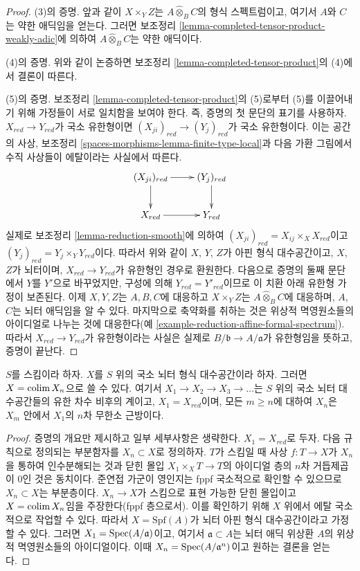 \begin{proof}
\medskip\noindent
(3)의 증명. 앞과 같이 $X \times_Y Z$는
$A \widehat{\otimes}_B C$의 형식 스펙트럼이고, 여기서 $A$와 $C$는
약한 애딕임을 얻는다. 그러면 보조정리
\ref{lemma-completed-tensor-product-weakly-adic}에 의하여
$A \widehat{\otimes}_B C$는 약한 애딕이다.

\medskip\noindent
(4)의 증명. 위와 같이 논증하면 보조정리
\ref{lemma-completed-tensor-product}의 (4)에서 결론이 따른다.

\medskip\noindent
(5)의 증명. 보조정리 \ref{lemma-completed-tensor-product}의 (5)로부터
(5)를 이끌어내기 위해 가정들이 서로 일치함을 보여야 한다.
즉, 증명의 첫 문단의 표기를 사용하자. %
$X_{red} \to Y_{red}$가 국소 유한형이면
$(X_{ji})_{red} \to (Y_j)_{red}$가 국소 유한형이다. 이는 공간의
사상, 보조정리 \ref{spaces-morphisms-lemma-finite-type-local}과 다음
가환 그림에서 수직 사상들이 에탈이라는 사실에서 따른다.
$$
\xymatrix{
(X_{ji})_{red} \ar[d] \ar[r] & (Y_j)_{red} \ar[d] \\
X_{red} \ar[r] & Y_{red}
}
$$
실제로 보조정리 \ref{lemma-reduction-smooth}에 의하여
$(X_{ji})_{red} = X_{ij} \times_X X_{red}$이고 %
$(Y_j)_{red} = Y_j \times_Y Y_{red}$이다. 따라서 위와 같이
$X$, $Y$, $Z$가 아핀 형식 대수공간이고, $X$, $Z$가 뇌터이며,
$X_{red} \to Y_{red}$가 유한형인 경우로 환원한다. 다음으로 증명의
둘째 문단에서 $Y$를 $Y'$으로 바꾸었지만, 구성에 의해
$Y_{red} = Y'_{red}$이므로 이 치환 아래 유한형 가정이 보존된다.
이제 $X, Y, Z$는 $A, B, C$에 대응하고 $X \times_Y Z$는
$A \widehat{\otimes}_B C$에 대응하며, $A$, $C$는 뇌터 애딕임을
알 수 있다. 마지막으로 축약화를 취하는 것은 위상적 멱영원소들의
아이디얼로 나누는 것에 대응한다(예
\ref{example-reduction-affine-formal-spectrum}). 따라서
$X_{red} \to Y_{red}$가 유한형이라는 사실은 실제로
$B/\mathfrak b \to A/\mathfrak a$가 유한형임을 뜻하고, 증명이
끝난다.
\end{proof}

\begin{lemma}
\label{lemma-structure-locally-noetherian}
$S$를 스킴이라 하자. $X$를 $S$ 위의 국소 뇌터 형식 대수공간이라
하자. 그러면 $X = \mathop{\mathrm{colim}}\nolimits X_n$으로 쓸 수 있다. 여기서
$X_1 \to X_2 \to X_3 \to \ldots$는 $S$ 위의 국소 뇌터
대수공간들의 유한 차수 비후의 계이고, $X_1 = X_{red}$이며, 모든
$m \geq n$에 대하여 $X_n$은 $X_m$ 안에서 $X_1$의 $n$차
무한소 근방이다.
\end{lemma}

\begin{proof}
증명의 개요만 제시하고 일부 세부사항은 생략한다.
$X_1 = X_{red}$로 두자. 다음 규칙으로 정의되는 부분함자를
$X_n \subset X$로 정의하자. $T$가 스킴일 때 사상
$f : T \to X$가 $X_n$을 통하여 인수분해되는 것과 닫힌 몰입
$X_1 \times_X T \to T$의 아이디얼 층의 $n$차 거듭제곱이 0인 것은
동치이다. 준연접 가군이 영인지는 fppf 국소적으로 확인할 수 있으므로
$X_n \subset X$는 부분층이다. $X_n \to X$가 스킴으로 표현 가능한
닫힌 몰입이고 $X = \mathop{\mathrm{colim}}\nolimits X_n$임을 주장한다(fppf 층으로서).
이를 확인하기 위해 $X$ 위에서 에탈 국소적으로 작업할 수 있다.
따라서 $X = \text{Spf}(A)$가 뇌터 아핀 형식 대수공간이라고 가정할
수 있다. 그러면 $X_1 = \mathop{\mathrm{Spec}}(A/\mathfrak a)$이고, 여기서
$\mathfrak a \subset A$는 뇌터 애딕 위상환 $A$의 위상적
멱영원소들의 아이디얼이다. 이때
$X_n = \mathop{\mathrm{Spec}}(A/\mathfrak a^n)$이고 원하는 결론을 얻는다.
\end{proof}

